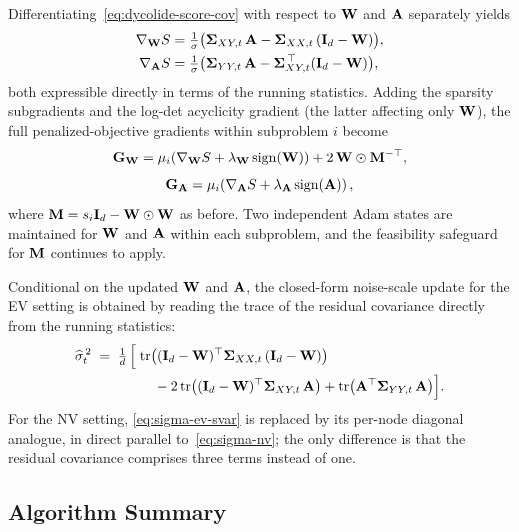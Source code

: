 \documentclass[journal,twoside]{IEEEtran}
\begin{document}
Differentiating~\eqref{eq:dycolide-score-cov} with respect to ${\mathbf W}$
and ${\mathbf A}$ separately yields
\begin{align}
\label{eq:grad-w-svar}
\nabla_{{\mathbf W}} S
&= \tfrac{1}{\sigma}\big(
  \boldsymbol{\Sigma}_{XY, t}\,{\mathbf A}
- \boldsymbol{\Sigma}_{XX, t}\,({\mathbf I}_d - {\mathbf W})
\big), \\
\label{eq:grad-a-svar}
\nabla_{{\mathbf A}} S
&= \tfrac{1}{\sigma}\big(
  \boldsymbol{\Sigma}_{YY, t}\,{\mathbf A}
- \boldsymbol{\Sigma}_{XY, t}^{\,\top}({\mathbf I}_d - {\mathbf W})
\big),
\end{align}
both expressible directly in terms of the running statistics. Adding
the sparsity subgradients and the log-det acyclicity gradient (the
latter affecting only ${\mathbf W}$), the full penalized-objective
gradients within subproblem $i$ become
\begin{equation}
\label{eq:full-grad-w-svar}
{\ensuremath{\mathbf G}}_{{\mathbf W}} = \mu_i\!\left(
  \nabla_{{\mathbf W}} S
+ \lambda_{{\mathbf W}}\,\mathrm{sign}({\mathbf W})
\right) + 2\,{\mathbf W} \odot {\ensuremath{\mathbf M}}^{-\top},
\end{equation}
\begin{equation}
\label{eq:full-grad-a-svar}
{\ensuremath{\mathbf G}}_{{\mathbf A}} = \mu_i\!\left(
  \nabla_{{\mathbf A}} S
+ \lambda_{{\mathbf A}}\,\mathrm{sign}({\mathbf A})
\right),
\end{equation}
where ${\mathbf M} = s_i {\mathbf I}_d - {\mathbf W} \odot {\ensuremath{\mathbf W}}$ as before. Two
independent Adam states are maintained for ${\mathbf W}$ and ${\mathbf A}$ within
each subproblem, and the feasibility safeguard for ${\mathbf M}$ continues
to apply.

Conditional on the updated ${\mathbf W}$ and ${\mathbf A}$, the closed-form
noise-scale update for the EV setting is obtained by reading the
trace of the residual covariance directly from the running statistics:
\begin{equation}
\label{eq:sigma-ev-svar}
\begin{split}
\widehat{\sigma}_t^{\,2}
\;=\; \tfrac{1}{d}\,\Big[\;&
  \mathrm{tr}\big( ({\mathbf I}_d - {\mathbf W})^\top \boldsymbol{\Sigma}_{XX, t}\,({\mathbf I}_d - {\mathbf W}) \big) \\
&\quad - 2\,\mathrm{tr}\big( ({\mathbf I}_d - {\mathbf W})^\top \boldsymbol{\Sigma}_{XY, t}\,{\mathbf A} \big)
+ \mathrm{tr}\big( {\mathbf A}^\top \boldsymbol{\Sigma}_{YY, t}\,{\mathbf A} \big) \Big].
\end{split}
\end{equation}
For the NV setting, \eqref{eq:sigma-ev-svar} is replaced by its
per-node diagonal analogue, in direct parallel
to~\eqref{eq:sigma-nv}; the only difference is that the residual
covariance comprises three terms instead of one.

\subsection{Algorithm Summary}
\label{sec:dycolide-stream-algo}
\end{document}

